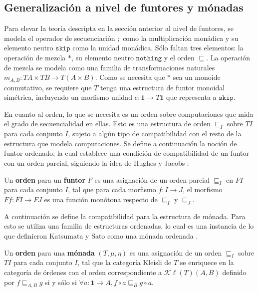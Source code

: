 \subsection{Generalización a nivel de funtores y mónadas}\label{mc:lifting}

Para elevar la teoría descripta en la sección anterior al nivel de funtores, se modela el operador de secuenciación $;$ como la multiplicación monádica y su elemento neutro $\mathtt{skip}$ como la unidad monádica. Sólo faltan tres elementos: la operación de mezcla $*$, su elemento neutro $\mathtt{nothing}$ y el orden $\sqsubseteq$. La operación de mezcla se modela como una familia de transformaciones naturales $m_{A,B} : \mathit{T} A \times \mathit{T} B \rightarrow \mathit{T} (A \times B)$. Como se necesita que $*$ sea un monoide conmutativo, se requiere que $\mathit{T}$ tenga una estructura de funtor monoidal simétrica, incluyendo un morfismo unidad $e : \mathbf{1} \rightarrow \mathit{T} \mathbf{1}$ que representa a $\mathtt{skip}$. 

En cuanto al orden, lo que se necesita es un orden sobre computaciones que mida el grado de secuencialidad en ellas. Esto es una estructura de orden $\sqsubseteq_I$ sobre $\mathit{T} I$ para cada conjunto $I$, sujeto a algún tipo de compatibilidad con el resto de la estructura que modela computaciones. Se define a continuación la noción de funtor ordenado, la cual establece una condición de compatibilidad de un funtor con un orden parcial, siguiendo la idea de Hughes y Jacobs \cite{hughes:2004}:

\begin{definition}
Un \textbf{orden} para un \textbf{funtor} $\mathit{F}$ es una asignación de un orden parcial $\sqsubseteq_I$ en $\mathit{F} I$ para cada conjunto $I$, tal que para cada morfismo $f : I \rightarrow J$, el morfismo $\mathit{F} f : \mathit{F} I \rightarrow \mathit{F} J$ es una función monótona respecto de $\sqsubseteq_I$ y $\sqsubseteq_J$.
\end{definition}

A continuación se define la compatibilidad para la estructura de mónada. Para esto se utiliza una familia de estructuras ordenadas, lo cual es una instancia de lo que definieron Katsumata y Sato como una mónada ordenada \cite{katsumata:2013}.

\begin{definition}\label{def:ordmon}
Un \textbf{orden} para una \textbf{mónada} $(\mathit{T},\mu,\eta)$ es una asignación de un orden $\sqsubseteq_I$ sobre $\mathit{T} I$ para cada conjunto $I$, tal que la categoría Kleisli de $T$ se enriquece en la categoría de órdenes con el orden correspondiente a $\mathcal{K}\ell(\mathit{T})(A,B)$ definido por $f \sqsubseteq_{A,B} g$ si y sólo si $\forall a : \mathbf{1} \rightarrow A, f \circ a \sqsubseteq_B g \circ a$.
\end{definition}

